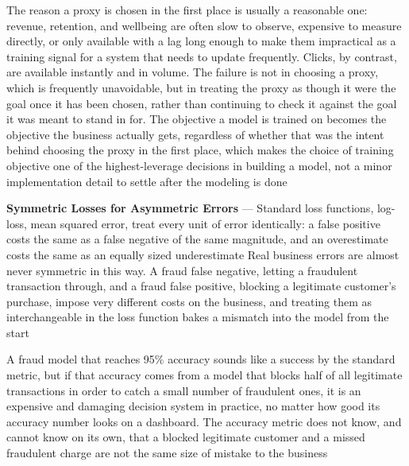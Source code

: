 The reason a proxy is chosen in the first place is usually a reasonable one:
revenue, retention, and wellbeing are often slow to observe, expensive to measure
directly, or only available with a lag long enough to make them impractical as a
training signal for a system that needs to update frequently. Clicks, by
contrast, are available instantly and in volume. The failure is not in choosing
a proxy, which is frequently unavoidable, but in treating the proxy as though it
were the goal once it has been chosen, rather than continuing to check it against
the goal it was meant to stand in for. The objective a model is trained on
becomes the objective the business actually gets, regardless of whether that was
the intent behind choosing the proxy in the first place, which makes the choice
of training objective one of the highest-leverage decisions in building a model,
not a minor implementation detail to settle after the modeling is done

\textbf{Symmetric Losses for Asymmetric Errors} --- Standard loss functions, log-loss,
mean squared error, treat every unit of error identically: a false positive costs
the same as a false negative of the same magnitude, and an overestimate costs
the same as an equally sized underestimate Real business errors are almost never
symmetric in this way. A fraud false negative, letting a fraudulent transaction
through, and a fraud false positive, blocking a legitimate customer's purchase, impose
very different costs on the business, and treating them as interchangeable in
the loss function bakes a mismatch into the model from the start

A fraud model that reaches 95\% accuracy sounds like a success by the standard
metric, but if that accuracy comes from a model that blocks half of all legitimate
transactions in order to catch a small number of fraudulent ones, it is an
expensive and damaging decision system in practice, no matter how good its accuracy
number looks on a dashboard. The accuracy metric does not know, and cannot know on
its own, that a blocked legitimate customer and a missed fraudulent charge are
not the same size of mistake to the business

